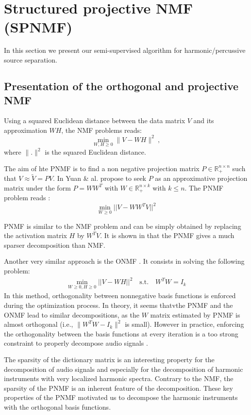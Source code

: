 \documentclass[journal]{IEEEtran}
\begin{document}
\section{Structured projective NMF (SPNMF)}
\label{sec:SPNMF}

In this section we present our semi-supervised algorithm for harmonic/percussive source separation.

\subsection{Presentation of the orthogonal and projective NMF}\label{subsec:PNMF}


Using a squared Euclidean distance between the data matrix $V$ and its approximation $WH$, the NMF problems reads:
$$
\min_{W,H\geq 0} \|V - WH\|^2\ , 
$$
where $\|.\|^{2}$ is the squared Euclidean distance.

The aim of hte PNMF is to find a non negative projection matrix $P \in \mathbb{R}_{+}^{n \times n}$ such that $V \approx \tilde{V} = PV$. In \cite{yuanOja2005} Yuan \& al. propose to seek $P$ as an approximative projection matrix under the form $P = WW^{T}$ with $W \in \mathbb{R}_{+}^{n \times k}$ with $ k \leqslant n $. The PNMF problem reads : 
\begin{equation}\label{EqPnmf}
\min_{W \geqslant 0} ||V - WW^{T}V||^2 
\end{equation}

PNMF is similar to the NMF problem and can be simply obtained by replacing the activation matrix $H$ by $W^TV$. It is shown in \cite{YangOja10} that the PNMF gives a much sparser decomposition than NMF.

Another very similar approach is the ONMF \cite{choi}. It consists in solving the following problem: 
\begin{align}
\min_{W \geqslant 0, H \geqslant0} ||V - WH||^2 \quad   \text{s.t}.\quad W^{T}W=I_{k} 
\end{align}%
In this method, orthogonality between nonnegative basis functions is enforced during the optimization process. In theory, it seems thatvthe PNMF and the ONMF lead to similar decompositions, as the $W$ matrix estimated by PNMF is almost orthogonal (i.e., $\|W^{T}W-I_{k}\|^{2}$ is small). However in practice, enforcing the orthogonality between the basis functions at every iteration is a too strong constraint to properly decompose audio signals \cite{laroche2015structured}. 

The sparsity of the dictionary matrix is an interesting property for the decomposition of audio signals and especially for the decomposition of harmonic instruments with very localized harmonic spectra. Contrary to the NMF, the sparsity of the PNMF is an inherent feature of the decomposition. These key properties of the PNMF motivated us to decompose the harmonic instruments with the orthogonal basis functions.
\end{document}
